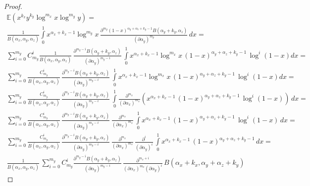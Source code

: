 \documentclass{article}
\begin{document}
\begin{theorem}
\begin{proof}
	\begin{multline*}
	\mathbb{E}(x^{k_x} y^{k_y} \log^{m_x} x \log^{m_y} y) = \\ \frac{1}{B(\alpha_x, \alpha_y, \alpha_z)} \int\limits_0^1 { x^{\alpha_x + k_x - 1} \log^{m_y}{x} \, \frac{\partial^{m_y} (1 - x)^{\alpha_y + \alpha_z + k_y - 1} B(\alpha_y + k_y, \alpha_z)}{(\partial \alpha_y)^{m_y}} \, dx } = 
	\\ \sum_{i=0}^{m_y}{ C^i_{m_y} \frac{1}{B(\alpha_x, \alpha_y, \alpha_z)} \, \frac{\partial^{m_y-i} B(\alpha_y + k_y, \alpha_z)}{(\partial \alpha_y)^{m_y-i}} \, \int\limits_0^1 { x^{\alpha_x + k_x - 1} \log^{m_x}{x} \, (1 - x)^{\alpha_y + \alpha_z + k_y - 1} \, \log^i{(1 - x)} dx }} = 
	\\ \sum_{i=0}^{m_y}{ \frac{C^i_{m_y}}{B(\alpha_x, \alpha_y, \alpha_z)} \, \frac{\partial^{m_y-i} B(\alpha_y + k_y, \alpha_z)}{(\partial \alpha_y)^{m_y-i}} \, \int\limits_0^1 { x^{\alpha_x + k_x - 1} \log^{m_x}{x} \, (1 - x)^{\alpha_y + \alpha_z + k_y - 1} \, \log^i{(1 - x)} dx }} = 
	\\ \sum_{i=0}^{m_y}{ \frac{C^i_{m_y}}{B(\alpha_x, \alpha_y, \alpha_z)} \, \frac{\partial^{m_y-i} B(\alpha_y + k_y, \alpha_z)}{(\partial \alpha_y)^{m_y-i}} \, \int\limits_0^1 { \frac{\partial^{m_x}}{(\partial \alpha_x)^{m_x}} (x^{\alpha_x + k_x - 1} \, (1 - x)^{\alpha_y + \alpha_z + k_y - 1} \, \log^i{(1 - x)}) \, dx }} = 
	\\ \sum_{i=0}^{m_y}{ \frac{C^i_{m_y}}{B(\alpha_x, \alpha_y, \alpha_z)} \, \frac{\partial^{m_y-i} B(\alpha_y + k_y, \alpha_z)}{(\partial \alpha_y)^{m_y-i}} \, \frac{\partial^{m_x}}{(\partial \alpha_x)^{m_x}} \, \int\limits_0^1 {x^{\alpha_x + k_x - 1} \, (1 - x)^{\alpha_y + \alpha_z + k_y - 1} \, \log^i{(1 - x)} \, dx }} = 
	\\ \sum_{i=0}^{m_y}{ \frac{C^i_{m_y}}{B(\alpha_x, \alpha_y, \alpha_z)} \, \frac{\partial^{m_y-i} B(\alpha_y + k_y, \alpha_z)}{(\partial \alpha_y)^{m_y-i}} \, \frac{\partial^{m_x}}{(\partial \alpha_x)^{m_x}} \,
		\frac{\partial^{i}}{(\partial \alpha_y)^{i}} \, \int\limits_0^1 {x^{\alpha_x + k_x - 1} \, (1 - x)^{\alpha_y + \alpha_z + k_y - 1} \, dx }} = 
	\\ \frac{1}{B(\alpha_x, \alpha_y, \alpha_z)} \,  \sum_{i=0}^{m_y}{ C^i_{m_y} \frac{\partial^{m_y-i} B(\alpha_y + k_y, \alpha_z)}{(\partial \alpha_y)^{m_y-i}} \, \frac{\partial^{m_x + i}}{(\partial \alpha_x)^{m_x} (\partial \alpha_y)^{i}} \, B(\alpha_x + k_x, \alpha_y + \alpha_z + k_y)}
	\end{multline*}
\end{proof}
\end{theorem}
\end{document}
